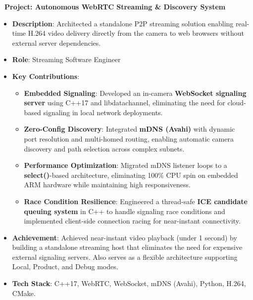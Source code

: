 \documentclass[letterpaper,10pt]{article}
\newenvironment{resume_list}{
  \vspace{-7pt}
  \begin{itemize}[itemsep=-2px, parsep=1pt, leftmargin=30pt]
}{
  \end{itemize}
}
\begin{document}
\begin{resume_list}
      \item \textbf{\faVideo\ Project: Autonomous WebRTC Streaming \& Discovery System}
        \begin{itemize}[itemsep=1pt, leftmargin=15pt, label=-]
          \item \textbf{Description}: Architected a standalone P2P streaming solution enabling real-time H.264 video delivery directly from the camera to web browsers without external server dependencies.
          \item \textbf{Role}: Streaming Software Engineer
          \item \textbf{Key Contributions}:
            \begin{itemize}[itemsep=0pt, leftmargin=10pt, label=$\circ$]
               \item \textbf{Embedded Signaling}: Developed an in-camera \textbf{WebSocket signaling server} using C++17 and libdatachannel, eliminating the need for cloud-based signaling in local network deployments.
               \item \textbf{Zero-Config Discovery}: Integrated \textbf{mDNS (Avahi)} with dynamic port resolution and multi-homed routing, enabling automatic camera discovery and path selection across complex subnets.
               \item \textbf{Performance Optimization}: Migrated mDNS listener loops to a \textbf{select()}-based architecture, eliminating 100\% CPU spin on embedded ARM hardware while maintaining high responsiveness.
               \item \textbf{Race Condition Resilience}: Engineered a thread-safe \textbf{ICE candidate queuing system} in C++ to handle signaling race conditions and implemented client-side connection racing for near-instant connectivity.
            \end{itemize}
          \item \textbf{Achievement}: Achieved near-instant video playback (under 1 second) by building a standalone streaming host that eliminates the need for expensive external signaling servers. Also serves as a flexible architecture supporting Local, Product, and Debug modes.
          \item \textbf{Tech Stack}: C++17, WebRTC, WebSocket, mDNS (Avahi), Python, H.264, CMake.
        \end{itemize}
   

\end{resume_list}
\end{document}
